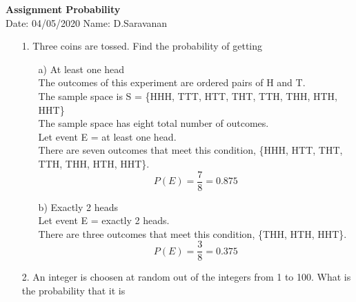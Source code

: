\documentclass[a4paper,11pt,openright]{report}
\begin{document}
\singlespacing
\pagestyle{plain}

\begin{center}
\textbf{Assignment Probability} \\
Date: 04/05/2020 \hspace{2mm} Name: D.Saravanan
\end{center}

\vspace{10px}

\begin{enumerate}

\item[1.] Three coins are tossed. Find the probability of getting
\begin{enumerate}

\item[a)] At least one head \\
The outcomes of this experiment are ordered pairs of H and T. \\
The sample space is S = \{HHH, TTT, HTT, THT, TTH, THH, HTH, HHT\} \\
The sample space has eight total number of outcomes. \\
Let event E =  at least one head. \\
There are seven outcomes that meet this condition, 
 \{HHH, HTT, THT, TTH, THH, HTH, HHT\}.\\
\begin{equation*}
P(E) = \frac{7}{8} = 0.875	
\end{equation*}

\item[b)] Exactly 2 heads \\
Let event E = exactly 2 heads. \\
There are three outcomes that meet this condition,
\{THH, HTH, HHT\}. \\
\begin{equation*}
P(E) = \frac{3}{8} = 0.375
\end{equation*}

\end{enumerate}
\vspace{5px}


\vspace{10px}

\pagebreak

\item[2.] An integer is choosen at random out of the integers from 1 to 100. What is the
probability that it is

\begin{enumerate}


\end{enumerate}
\end{enumerate}
\end{document}
